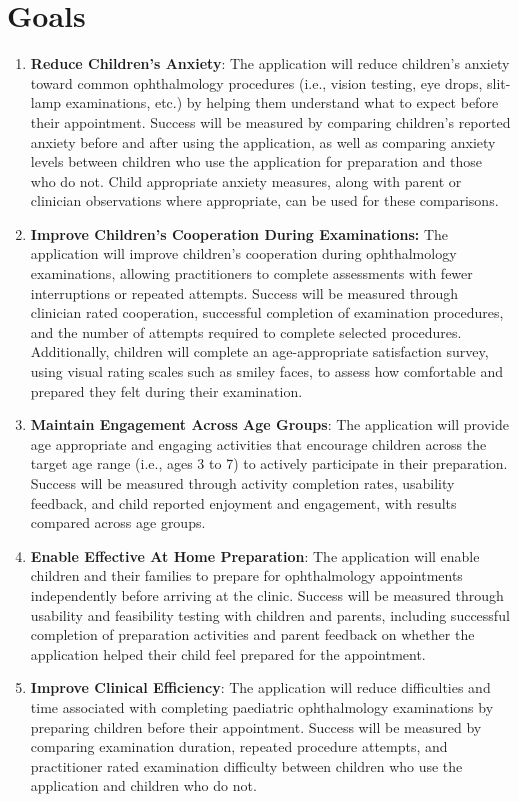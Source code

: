 \documentclass{article}
\begin{document}
\section{Goals}
\begin{enumerate}
    \item \textbf{Reduce Children's Anxiety}: 
    The application will reduce children's anxiety toward common ophthalmology procedures 
    (i.e., vision testing, eye drops, slit-lamp examinations, etc.) by helping them understand 
    what to expect before their appointment. Success will be measured by comparing children's 
    reported anxiety before and after using the application, as well as comparing anxiety 
    levels between children who use the application for preparation and those who do not. 
    Child appropriate anxiety measures, along with parent or clinician observations where 
    appropriate, can be used for these comparisons.

    \item \textbf{Improve Children's Cooperation During Examinations:}
    The application will improve children's cooperation during
    ophthalmology examinations, allowing practitioners to complete
    assessments with fewer interruptions or repeated attempts.
    Success will be measured through clinician rated cooperation,
    successful completion of examination procedures, and the
    number of attempts required to complete selected procedures.
    Additionally, children will complete an age-appropriate
    satisfaction survey, using visual rating scales such as
    smiley faces, to assess how comfortable and prepared they
    felt during their examination.

    \item \textbf{Maintain Engagement Across Age Groups}: 
    The application will provide age appropriate and engaging activities that encourage 
    children across the target age range (i.e., ages 3 to 7) to actively participate in 
    their preparation. Success will be measured through activity completion rates, usability 
    feedback, and child reported enjoyment and engagement, with results compared across 
    age groups.

    \item \textbf{Enable Effective At Home Preparation}: 
    The application will enable children and their families to prepare for ophthalmology 
    appointments independently before arriving at the clinic. Success will be measured 
    through usability and feasibility testing with children and parents, including successful 
    completion of preparation activities and parent feedback on whether the application 
    helped their child feel prepared for the appointment.

    \item \textbf{Improve Clinical Efficiency}: 
    The application will reduce difficulties and time associated with completing paediatric 
    ophthalmology examinations by preparing children before their appointment. Success will 
    be measured by comparing examination duration, repeated procedure attempts, and 
    practitioner rated examination difficulty between children who use the application and 
    children who do not.
\end{enumerate}
\end{document}
